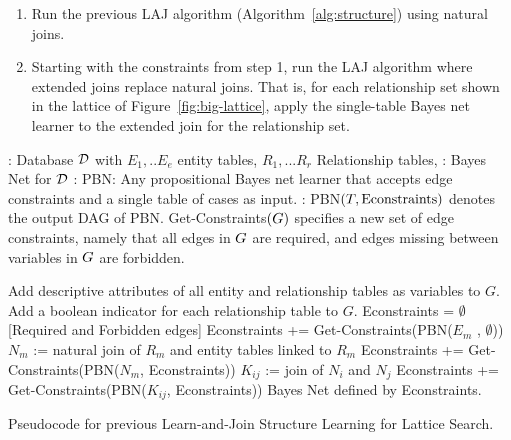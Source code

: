 \documentclass[runningheads,a4paper]{llncs}
\begin{document}
\begin{enumerate}
\item Run the previous LAJ algorithm (Algorithm~\ref{alg:structure}) using natural joins.
\item Starting with the constraints from step 1, run the LAJ algorithm where extended joins replace natural joins. That is, for each relationship set shown in the lattice of Figure~\ref{fig:big-lattice}, apply the single-table Bayes net learner to the extended join for the relationship set.
\end{enumerate}


\begin{algorithm}[htb]
\begin{algorithmic}
{\footnotesize
{}: Database $\mathcal{D}$ with $E_1,..E_e$ entity tables, $R_1,... R_r$ Relationship tables, %
: Bayes Net for $\mathcal{D}$ 
: PBN: Any propositional Bayes net learner that accepts edge constraints and a single table of cases as input. 
: PBN$(T,\mbox{Econstraints})$ denotes the output DAG of PBN. Get-Constraints$(G)$ specifies a new set of edge constraints, namely that all edges in $G$ are required, and edges missing between variables in $G$ are forbidden.
} %
\end{algorithmic}
\begin{algorithmic}[1]
{\footnotesize
  \STATE Add descriptive attributes of all entity and relationship tables as variables to  $G$. Add a boolean indicator for each relationship table to $G$.
  \STATE Econstraints = $\emptyset$ {[Required and Forbidden edges]} %
  \STATE Econstraints += Get-Constraints(PBN($E_m$ , $\emptyset$)) 
  \ENDFOR 
{}
  \STATE $N_m$ :=  natural 
  join of $R_m$ and entity tables linked to $R_m$ 
  \STATE Econstraints += Get-Constraints(PBN($N_m$, Econstraints))
\ENDFOR
{}
  \STATE $K_{ij}$ :=  %
  join of $N_i$ and $N_j$ 
  \STATE Econstraints += Get-Constraints(PBN($K_{ij}$, Econstraints))
\ENDFOR
\RETURN Bayes Net defined by Econstraints.

    } %
\end{algorithmic}
\caption{Pseudocode for previous Learn-and-Join Structure Learning for Lattice Search. \label{alg:structure}}
\end{algorithm}
\end{document}
